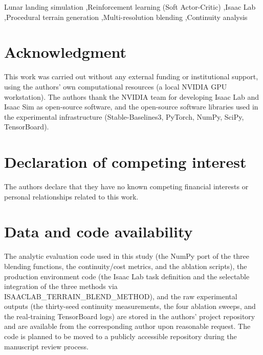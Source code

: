 \documentclass[a4paper,fleqn]{cas-sc}
\begin{document}
\begin{keywords}
Lunar landing simulation \sep Reinforcement learning (Soft Actor-Critic)
\sep Isaac Lab \sep Procedural terrain generation \sep Multi-resolution
blending \sep Continuity analysis
\end{keywords}

\maketitle








\section*{Acknowledgment}
This work was carried out without any external funding or institutional
support, using the authors' own computational resources (a local NVIDIA
GPU workstation). The authors thank the NVIDIA team for developing Isaac
Lab and Isaac Sim as open-source software, and the open-source software
libraries used in the experimental infrastructure (Stable-Baselines3,
PyTorch, NumPy, SciPy, TensorBoard).

\section*{Declaration of competing interest}
The authors declare that they have no known competing financial
interests or personal relationships related to this work.

\section*{Data and code availability}
The analytic evaluation code used in this study (the NumPy port of the
three blending functions, the continuity/cost metrics, and the ablation
scripts), the production environment code (the Isaac Lab task definition
and the selectable integration of the three methods via
ISAACLAB\_TERRAIN\_BLEND\_METHOD), and the raw experimental outputs (the
thirty-seed continuity measurements, the four ablation sweeps, and the
real-training TensorBoard logs) are stored in the authors' project
repository and are available from the corresponding author upon
reasonable request. The code is planned to be moved to a publicly
accessible repository
during the manuscript review process.
\end{document}
